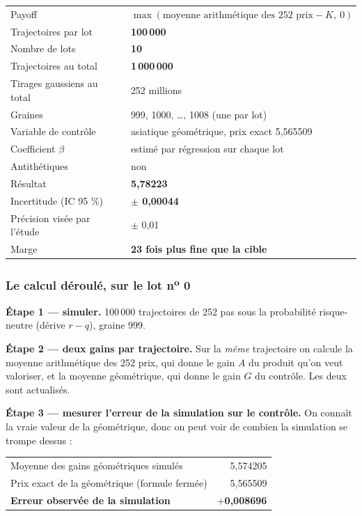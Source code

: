 \documentclass[11pt,a4paper]{article}
\begin{document}
\begin{center}
\small
\begin{tabular}{ll}
\toprule
Payoff & $\max(\text{moyenne arithmétique des 252 prix} - K,\ 0)$ \\
Trajectoires par lot & \textbf{100\,000} \\
Nombre de lots & \textbf{10} \\
Trajectoires au total & \textbf{1\,000\,000} \\
Tirages gaussiens au total & 252 millions \\
Graines & 999, 1000, \dots, 1008 (une par lot) \\
Variable de contrôle & asiatique géométrique, prix exact 5,565509 \\
Coefficient $\beta$ & estimé par régression sur chaque lot \\
Antithétiques & non \\
\midrule
Résultat & \textbf{5,78223} \\
Incertitude (IC 95 \%) & \textbf{$\pm$ 0,00044} \\
Précision visée par l'étude & $\pm$ 0,01 \\
Marge & \textbf{23 fois plus fine que la cible} \\
\bottomrule
\end{tabular}
\end{center}

\subsubsection*{Le calcul déroulé, sur le lot n\textsuperscript{o} 0}

\textbf{Étape 1 --- simuler.} 100\,000 trajectoires de 252 pas sous la
probabilité risque-neutre (dérive $r-q$), graine 999.

\textbf{Étape 2 --- deux gains par trajectoire.} Sur la \emph{même} trajectoire
on calcule la moyenne arithmétique des 252 prix, qui donne le gain $A$ du
produit qu'on veut valoriser, et la moyenne géométrique, qui donne le gain $G$
du contrôle. Les deux sont actualisés.

\textbf{Étape 3 --- mesurer l'erreur de la simulation sur le contrôle.} On
connaît la vraie valeur de la géométrique, donc on peut voir de combien la
simulation se trompe dessus :

\begin{center}
\small
\begin{tabular}{lr}
\toprule
Moyenne des gains géométriques simulés & 5,574205 \\
Prix exact de la géométrique (formule fermée) & 5,565509 \\
\midrule
\textbf{Erreur observée de la simulation} & \textbf{$+$0,008696} \\
\bottomrule
\end{tabular}
\end{center}
\end{document}

